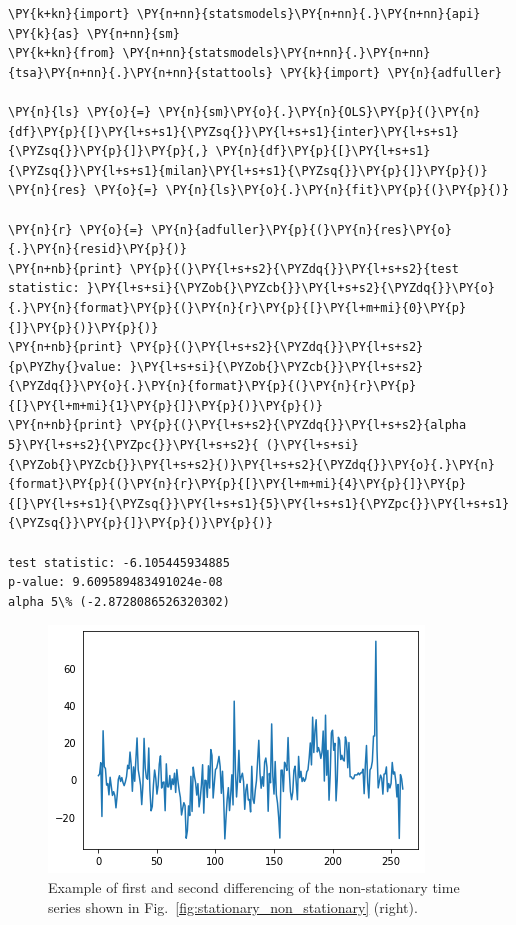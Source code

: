 \begin{codebox}[breakable, size=fbox, boxrule=1pt, pad at break*=1mm,colback=cellbackground, colframe=cellborder]
\begin{Verbatim}[commandchars=\\\{\}]
\PY{k+kn}{import} \PY{n+nn}{statsmodels}\PY{n+nn}{.}\PY{n+nn}{api} \PY{k}{as} \PY{n+nn}{sm}
\PY{k+kn}{from} \PY{n+nn}{statsmodels}\PY{n+nn}{.}\PY{n+nn}{tsa}\PY{n+nn}{.}\PY{n+nn}{stattools} \PY{k}{import} \PY{n}{adfuller}

\PY{n}{ls} \PY{o}{=} \PY{n}{sm}\PY{o}{.}\PY{n}{OLS}\PY{p}{(}\PY{n}{df}\PY{p}{[}\PY{l+s+s1}{\PYZsq{}}\PY{l+s+s1}{inter}\PY{l+s+s1}{\PYZsq{}}\PY{p}{]}\PY{p}{,} \PY{n}{df}\PY{p}{[}\PY{l+s+s1}{\PYZsq{}}\PY{l+s+s1}{milan}\PY{l+s+s1}{\PYZsq{}}\PY{p}{]}\PY{p}{)}
\PY{n}{res} \PY{o}{=} \PY{n}{ls}\PY{o}{.}\PY{n}{fit}\PY{p}{(}\PY{p}{)}

\PY{n}{r} \PY{o}{=} \PY{n}{adfuller}\PY{p}{(}\PY{n}{res}\PY{o}{.}\PY{n}{resid}\PY{p}{)}
\PY{n+nb}{print} \PY{p}{(}\PY{l+s+s2}{\PYZdq{}}\PY{l+s+s2}{test statistic: }\PY{l+s+si}{\PYZob{}\PYZcb{}}\PY{l+s+s2}{\PYZdq{}}\PY{o}{.}\PY{n}{format}\PY{p}{(}\PY{n}{r}\PY{p}{[}\PY{l+m+mi}{0}\PY{p}{]}\PY{p}{)}\PY{p}{)}
\PY{n+nb}{print} \PY{p}{(}\PY{l+s+s2}{\PYZdq{}}\PY{l+s+s2}{p\PYZhy{}value: }\PY{l+s+si}{\PYZob{}\PYZcb{}}\PY{l+s+s2}{\PYZdq{}}\PY{o}{.}\PY{n}{format}\PY{p}{(}\PY{n}{r}\PY{p}{[}\PY{l+m+mi}{1}\PY{p}{]}\PY{p}{)}\PY{p}{)}
\PY{n+nb}{print} \PY{p}{(}\PY{l+s+s2}{\PYZdq{}}\PY{l+s+s2}{alpha 5}\PY{l+s+s2}{\PYZpc{}}\PY{l+s+s2}{ (}\PY{l+s+si}{\PYZob{}\PYZcb{}}\PY{l+s+s2}{)}\PY{l+s+s2}{\PYZdq{}}\PY{o}{.}\PY{n}{format}\PY{p}{(}\PY{n}{r}\PY{p}{[}\PY{l+m+mi}{4}\PY{p}{]}\PY{p}{[}\PY{l+s+s1}{\PYZsq{}}\PY{l+s+s1}{5}\PY{l+s+s1}{\PYZpc{}}\PY{l+s+s1}{\PYZsq{}}\PY{p}{]}\PY{p}{)}\PY{p}{)}

test statistic: -6.105445934885
p-value: 9.609589483491024e-08
alpha 5\% (-2.8728086526320302)
\end{Verbatim}
\end{codebox}

\begin{figure}[htb]
	\centering
	\includegraphics[width=0.7\linewidth]{figures/residual_plot.png}
	\caption{Example of first and second differencing of the non-stationary time series shown in Fig.~\ref{fig:stationary_non_stationary} (right).}
	\label{fig:residual}
\end{figure}
    
